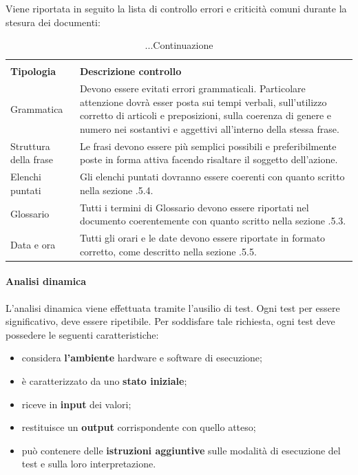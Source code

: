 \noindent Viene riportata in seguito la lista di controllo errori e criticità comuni durante la stesura dei documenti:

\renewcommand{\arraystretch}{2.2}

\begin{longtable}{|C{4cm}|C{8.5cm}|}
	\caption{Tabella per la lista di controllo}\\
	\textbf{Tipologia} & \textbf{Descrizione controllo}\\
	\endfirsthead
	
	\caption[]{...Continuazione}

	\endhead
	
	Grammatica & Devono essere evitati errori grammaticali. Particolare attenzione dovrà esser posta sui tempi verbali, sull'utilizzo corretto di articoli e preposizioni, sulla coerenza di genere e numero nei sostantivi e aggettivi all'interno della stessa frase. \\
	
	Struttura della frase & Le frasi devono essere più semplici possibili e preferibilmente poste in forma attiva facendo risaltare il soggetto dell'azione. \\
	
	Elenchi puntati & Gli elenchi puntati dovranno essere coerenti con quanto scritto nella sezione .5.4. \\
	
	Glossario & Tutti i termini di Glossario devono essere riportati nel documento coerentemente con quanto scritto nella sezione .5.3. \\
	
	Data e ora & Tutti gli orari e le date devono essere riportate in formato corretto, come descritto nella sezione .5.5. \\
	\hline
\end{longtable}



\paragraph{Analisi dinamica}
L'analisi dinamica viene effettuata tramite l'ausilio di test. Ogni test per essere significativo, deve essere ripetibile. Per soddisfare tale richiesta, ogni test deve possedere le seguenti caratteristiche:
\begin{itemize}
	\item considera \textbf{l'ambiente} hardware e software di esecuzione;
	\item è caratterizzato da uno \textbf{stato iniziale};
	\item riceve in \textbf{input} dei valori;
	\item restituisce un \textbf{output} corrispondente con quello atteso;
	\item può contenere delle \textbf{istruzioni aggiuntive} sulle modalità di esecuzione del test e sulla loro interpretazione.
\end{itemize}

